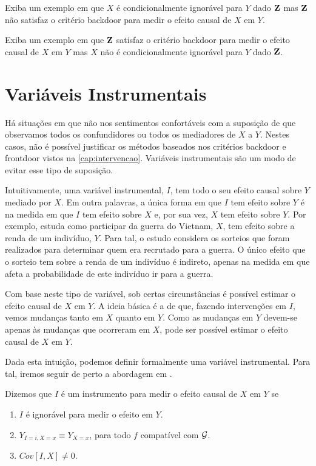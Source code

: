 \begin{exercise}
 Exiba um exemplo em que
 $X$ é condicionalmente ignorável para $Y$ dado ${\mathbf{Z}}$ mas
 ${\mathbf{Z}}$ não satisfaz o critério backdoor para
 medir o efeito causal de $X$ em $Y$.
\end{exercise}

\begin{exercise}
 Exiba um exemplo em que
 ${\mathbf{Z}}$ satisfaz o critério backdoor para
 medir o efeito causal de $X$ em $Y$ mas
 $X$ não é condicionalmente ignorável para $Y$ dado ${\mathbf{Z}}$.
\end{exercise}

\section{Variáveis Instrumentais}
\label{sec:instrument}

Há situações em que 
não nos sentimentos confortáveis com
a suposição de que observamos
todos os confundidores ou
todos os mediadores de $X$ a $Y$.
Nestes casos, não é possível
justificar os métodos baseados
nos critérios backdoor e frontdoor
vistos na \cref{cap:intervencao}.
Variáveis instrumentais são 
um modo de evitar esse tipo de suposição.

Intuitivamente, uma variável instrumental, $I$, tem
todo o seu efeito causal sobre $Y$ mediado por $X$.
Em outra palavras, a única forma em que $I$ tem
efeito sobre $Y$ é na medida em que 
$I$ tem efeito sobre $X$ e, por sua vez,
$X$ tem efeito sobre $Y$.
Por exemplo, \citet{Angrist1990} estuda
como participar da guerra do Vietnam, $X$, 
tem efeito sobre a renda de um indivíduo, $Y$.
Para tal, o estudo considera 
os sorteios que foram realizados para
determinar quem era recrutado para a guerra.
O único efeito que o sorteio tem
sobre a renda de um indivíduo é indireto,
apenas na medida em que afeta
a probabilidade de este indivíduo ir para a guerra.

Com base neste tipo de variável,
sob certas circunstâncias 
é possível estimar o efeito causal de $X$ em $Y$.
A ideia básica é a de que,
fazendo intervenções em $I$,
vemos mudanças tanto em $X$ quanto em $Y$.
Como as mudanças em $Y$ devem-se apenas 
às mudanças que ocorreram em $X$,
pode ser possível estimar o efeito causal de $X$ em $Y$.

Dada esta intuição, podemos
definir formalmente uma variável instrumental.
Para tal, iremos seguir de perto 
a abordagem em \citet{Angrist1996}.

\begin{definition}
 \label{def:instrument}
 Dizemos que $I$ é um instrumento para
 medir o efeito causal de $X$ em $Y$ se
 \begin{enumerate}
  \item $I$ é ignorável para medir o efeito em $Y$.
  \item $Y_{I=i,X=x} \equiv Y_{X=x}$,
  para todo $f$ compatível com ${\mathcal G}$.
  \item $Cov[I,X] \neq 0$.
 \end{enumerate}
\end{definition}

